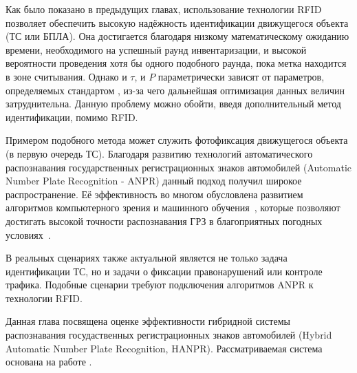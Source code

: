\documentclass[12pt]{article}
\theoremstyle{definition}
\begin{document}
Как было показано в предыдущих главах, использование технологии RFID позволяет обеспечить высокую надёжность идентификации движущегося объекта (ТС или БПЛА). Она достигается благодаря низкому математическому ожиданию времени, необходимого на успешный раунд инвентаризации, и высокой вероятности проведения хотя бы одного подобного раунда, пока метка находится в зоне считывания. Однако и $\tau$, и $P$ параметрически зависят от параметров, определяемых стандартом \cite{StdGen2}, из-за чего дальнейшая оптимизация данных величин затруднительна. Данную проблему можно обойти, введя дополнительный метод идентификации, помимо RFID.

Примером подобного метода может служить фотофиксация движущегося объекта (в первую очередь ТС). Благодаря развитию технологий автоматического распознавания государственных регистрационных знаков автомобилей (Automatic Number Plate Recognition - ANPR) данный подход получил широкое распространение. Её эффективность во многом обусловлена развитием алгоритмов компьютерного зрения и машинного обучения~\cite{Kumawat2023, Sonnara2025, Upadhye2025}, которые позволяют достигать высокой точности распознавания ГРЗ в благоприятных погодных условиях~\cite{ANPR21}.

В реальных сценариях также актуальной является не только задача идентификации ТС, но и задачи о фиксации правонарушений или контроле трафика. Подобные сценарии требуют подключения алгоритмов ANPR к технологии RFID.

Данная глава посвящена оценке эффективности гибридной системы распознавания госудаственных регистрационных знаков автомобилей (Hybrid Automatic Number Plate Recognition, HANPR). Рассматриваемая система основана на работе \cite{Vishnevsky2022}.

\end{document}
